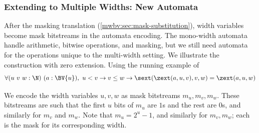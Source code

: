 \subsubsection{Extending to Multiple Widths: New Automata}

After the masking translation (\cref{mwbv:sec:mask-substitution}), width variables
become mask bitstreams in the automata encoding.
The mono-width automata handle arithmetic, bitwise operations, and masking,
but we still need automata for the operations unique to the multi-width setting.
We illustrate the construction with zero extension.
Using the running example of
\[
\forall (u~v~w : \N)~(a : \BV{u}),~
u < v \to v \leq w \to
\sext(\zext(a, u, v), v, w) = \zext(a, u, w)
\]

We encode the width variables $u, v, w$ as mask bitstreams $m_u, m_v, m_w$.
These bitstreams are such that the first $u$ bits of $m_u$ are $1$s and the rest are $0$s, and similarly for $m_v$ and $m_w$.
Note that $m_u = 2^u - 1$, and similarly for $m_v, m_w$; each is the mask for its corresponding width.

